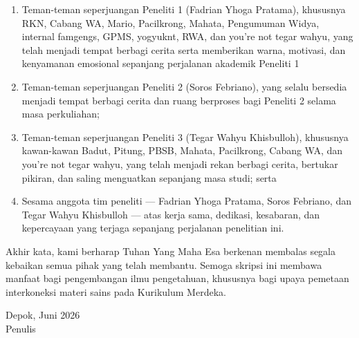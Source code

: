 \documentclass[../../thesis]{subfiles}
\begin{document}
\begin{enumerate}
        dan menjadi tempat berbagi suka maupun duka kami masing-masing
        sepanjang proses penyusunan skripsi ini;
  \item Teman-teman seperjuangan Peneliti 1 (Fadrian Yhoga Pratama),
        khususnya RKN, Cabang WA, Mario, Pacilkrong, Mahata, Pengumuman
        Widya, internal famgengs, GPMS, yogyuknt, RWA, dan you're not tegar
        wahyu, yang telah menjadi tempat berbagi cerita serta memberikan
        warna, motivasi, dan kenyamanan emosional sepanjang perjalanan
        akademik Peneliti 1
  \item Teman-teman seperjuangan Peneliti 2 (Soros Febriano), yang selalu
        bersedia menjadi tempat berbagi cerita dan ruang berproses bagi
        Peneliti 2 selama masa perkuliahan;
  \item Teman-teman seperjuangan Peneliti 3 (Tegar Wahyu Khisbulloh),
        khususnya kawan-kawan Badut, Pitung, PBSB, Mahata, Pacilkrong, Cabang WA, dan you're not tegar wahyu, yang
        telah menjadi rekan berbagi cerita, bertukar pikiran, dan saling
        menguatkan sepanjang masa studi; serta
  \item Sesama anggota tim peneliti --- Fadrian Yhoga Pratama, Soros
        Febriano, dan Tegar Wahyu Khisbulloh --- atas kerja sama,
        dedikasi, kesabaran, dan kepercayaan yang terjaga sepanjang
        perjalanan penelitian ini.
\end{enumerate}

\noindent Akhir kata, kami berharap Tuhan Yang Maha Esa berkenan membalas
segala kebaikan semua pihak yang telah membantu. Semoga skripsi ini membawa
manfaat bagi pengembangan ilmu pengetahuan, khususnya bagi upaya pemetaan
interkoneksi materi sains pada Kurikulum Merdeka.
\vspace{1cm}

\noindent\begin{minipage}{\linewidth}
\begin{flushright}
Depok, Juni 2026\\[1.5cm]
Penulis
\end{flushright}
\end{minipage}
\end{document}
